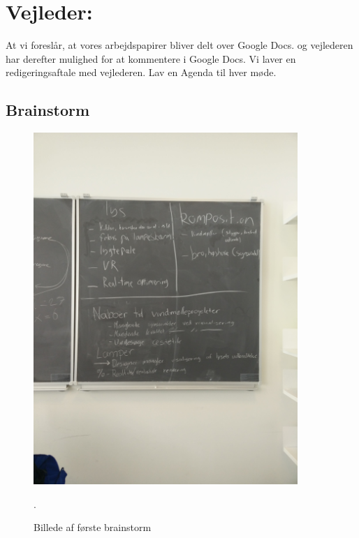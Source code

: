 \documentclass[oneside,a4paper,titlepage]{article}
\begin{document}
\section*{Vejleder:}
At vi foreslår, at vores arbejdspapirer bliver delt over Google Docs. og vejlederen har derefter mulighed for at kommentere i Google Docs. Vi laver en redigeringsaftale med vejlederen.
Lav en Agenda til hver møde.

\clearpage
\subsection{Brainstorm}
\begin{figure}[H]
   \centering
   \includegraphics[width=10cm]{./../graphics/brainstorm_1}
   \caption{Billede af første brainstorm}.
\end{figure}
\end{document}
